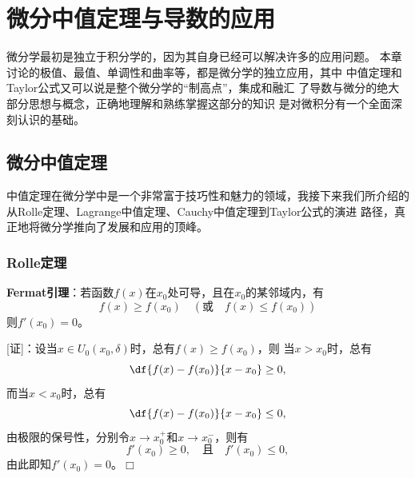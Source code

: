 \setcounter{chapter}{2}

\chapter{微分中值定理与导数的应用}

微分学最初是独立于积分学的，因为其自身已经可以解决许多的应用问题。
本章讨论的极值、最值、单调性和曲率等，都是微分学的独立应用，其中
中值定理和Taylor公式又可以说是整个微分学的“制高点”，集成和融汇
了导数与微分的绝大部分思想与概念，正确地理解和熟练掌握这部分的知识
是对微积分有一个全面深刻认识的基础。

\section{微分中值定理}

中值定理在微分学中是一个非常富于技巧性和魅力的领域，我接下来我们所介绍的
从Rolle定理、Lagrange中值定理、Cauchy中值定理到Taylor公式的演进
路径，真正地将微分学推向了发展和应用的顶峰。

\subsection{Rolle定理}

\begin{thx}
	{\bf Fermat引理}：若函数$f(x)$在$x_0$处可导，且在$x_0$的某邻域内，有
	$$f(x)\geq f(x_0)\quad (\mbox{或}\quad f(x)\leq f(x_0))$$
	则$f'(x_0)=0$。
\end{thx}

[证]：设当$x\in U_0(x_0,\delta)$时，总有$f(x)\geq f(x_0)$，则
当$x>x_0$时，总有
$$\df{f(x)-f(x_0)}{x-x_0}\geq 0,$$
而当$x<x_0$时，总有
$$\df{f(x)-f(x_0)}{x-x_0}\leq 0,$$
由极限的保号性，分别令$x\to x_0^+$和$x\to x_0^-$，则有
$$f'(x_0)\geq 0,\quad\mbox{且}\quad f'(x_0)\leq 0,$$
由此即知$f'(x_0)=0$。\hfill$\Box$


